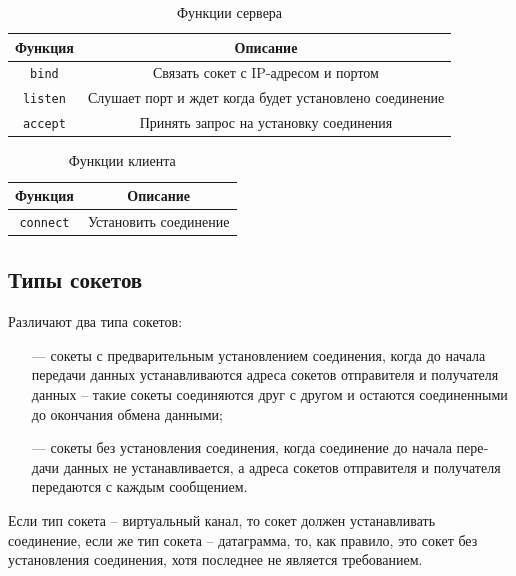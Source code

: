 \begin{table}[h]
	\begin{center}
		\begin{tabular}{ |c|c| }
			\hline 
			Функция & Описание \\  \hline
			\texttt{bind} &  Связать сокет с IP-адресом и портом \\ \hline
			\texttt{listen} & Слушает порт и ждет когда будет установлено соединение\\ \hline 
			\texttt{accept} & Принять запрос на установку соединения \\ \hline 
		\end{tabular}
		\caption{\label{tab:socket_server} Функции сервера}
	\end{center}
\end{table}

\begin{table}[h]
	\begin{center}
		\begin{tabular}{ |c|c| }
			\hline 
			Функция & Описание \\  \hline
			\texttt{connect} & Установить соединение \\ \hline
		\end{tabular}
		\caption{\label{tab:socket_client}Функции клиента}
	\end{center}
\end{table}

\subsection{Типы сокетов}

Различают два типа сокетов:

\begin{itemize}
	\item[---] сокеты с предварительным установлением соединения, когда до начала передачи данных устанавливаются адреса сокетов отправителя и получателя данных – такие сокеты соединяются друг с другом и остаются соединенными до окончания обмена данными;

	\item[---] сокеты без установления соединения, когда соединение до начала пере­ дачи данных не устанавливается, а адреса сокетов отправителя и получателя передаются с каждым сообщением.
\end{itemize}

Если тип сокета – виртуальный канал, то сокет должен устанавливать соединение, если же тип сокета – датаграмма, то, как правило, это сокет без установления соединения, хотя последнее не является требованием.

